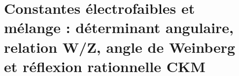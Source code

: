 \chapter{Constantes électrofaibles et mélange : déterminant angulaire, relation W/Z, angle de Weinberg et réflexion rationnelle CKM}
\label{chap:p3-final:49:sector_electrodebil}






